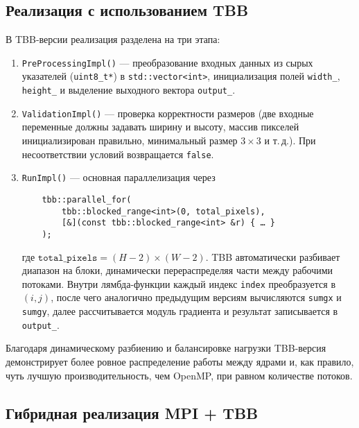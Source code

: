 \documentclass[12pt]{article}
\begin{document}
\subsection{Реализация с использованием TBB}

В TBB-версии реализация разделена на три этапа:
\begin{enumerate}
    \item \texttt{PreProcessingImpl()} — преобразование входных данных из сырых указателей (\texttt{uint8\_t*}) в \texttt{std::vector<int>}, инициализация полей \texttt{width\_}, \texttt{height\_} и выделение выходного вектора \texttt{output\_}.
    \item \texttt{ValidationImpl()} — проверка корректности размеров (две входные переменные должны задавать ширину и высоту, массив пикселей инициализирован правильно, минимальный размер $3 \times 3$ и т.\,д.). При несоответствии условий возвращается \texttt{false}.
    \item \texttt{RunImpl()} — основная параллелизация через
    \begin{verbatim}
    tbb::parallel_for(
        tbb::blocked_range<int>(0, total_pixels),
        [&](const tbb::blocked_range<int> &r) { … }
    );
    \end{verbatim}
    где \(\texttt{total\_pixels} = (H-2)\times(W-2)\). TBB автоматически разбивает диапазон на блоки, динамически перераспределяя части между рабочими потоками. Внутри лямбда-функции каждый индекс \texttt{index} преобразуется в $(i,j)$, после чего аналогично предыдущим версиям вычисляются \texttt{sumgx} и \texttt{sumgy}, далее рассчитывается модуль градиента и результат записывается в \texttt{output\_}. 
\end{enumerate}
Благодаря динамическому разбиению и балансировке нагрузки TBB-версия демонстрирует более ровное распределение работы между ядрами и, как правило, чуть лучшую производительность, чем OpenMP, при равном количестве потоков.

\subsection{Гибридная реализация MPI + TBB}
\end{document}
